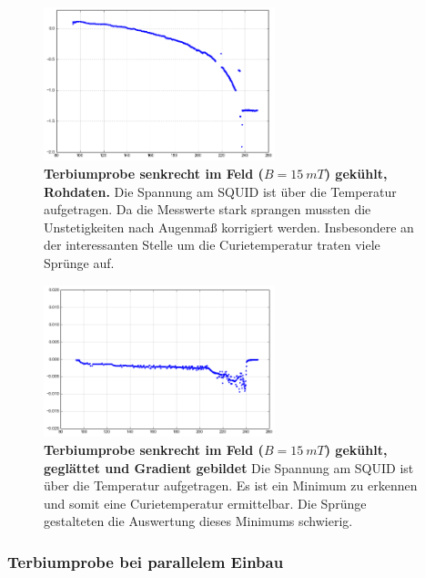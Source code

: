 \documentclass[a4paper,ngerman]{scrartcl}
\begin{document}
\begin{figure}
\centering
\includegraphics[width=0.6\textwidth]{abbildungen/Tb_sr_150.png}
\caption[Terbiumprobe senkrecht bei Nullfeld]{\textbf{Terbiumprobe senkrecht im Feld ($B = \SI{15}{mT}$) gekühlt, Rohdaten.} 
Die Spannung am SQUID ist über die Temperatur aufgetragen. 
Da die Messwerte stark sprangen mussten die Unstetigkeiten nach Augenmaß korrigiert werden.
Insbesondere an der interessanten Stelle um die Curietemperatur traten viele Sprünge auf.}
\label{fig:Tb_sr_15}
\end{figure}




\begin{figure}
\centering
\includegraphics[width=0.6\textwidth]{abbildungen/Tb_sr_150_grad.png}
\caption[Terbiumprobe senkrecht bei Nullfeld]{\textbf{Terbiumprobe senkrecht im Feld ($B = \SI{15}{mT}$) gekühlt, geglättet und Gradient gebildet} 
Die Spannung am SQUID ist über die Temperatur aufgetragen. 
Es ist ein Minimum zu erkennen und somit eine Curietemperatur ermittelbar.
Die Sprünge gestalteten die Auswertung dieses Minimums schwierig.}
\label{fig:Tb_sr_15_grad}
\end{figure}



\subsubsection{Terbiumprobe bei parallelem Einbau}
\end{document}

